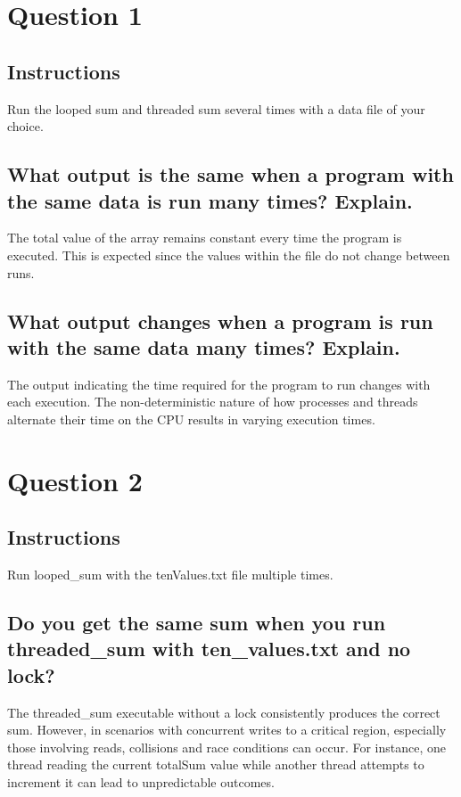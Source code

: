 \documentclass{assignment-x}
\begin{document}
\maketitle
\pagebreak

\section{Question 1}
\subsection{Instructions}
Run the looped sum and threaded sum several times with a data file of your choice.

\subsection{What output is the same when a program with the same data is run many times? Explain.}
The total value of the array remains constant every time the program is executed. This is expected since the values within the file do not change between runs.

\subsection{What output changes when a program is run with the same data many times? Explain.}
The output indicating the time required for the program to run changes with each execution. The non-deterministic nature of how processes and threads alternate their time on the CPU results in varying execution times.

\section{Question 2}
\subsection{Instructions}
Run looped\_sum with the tenValues.txt file multiple times.

\subsection{Do you get the same sum when you run threaded\_sum with ten\_values.txt and no lock?}
The threaded\_sum executable without a lock consistently produces the correct sum. However, in scenarios with concurrent writes to a critical region, especially those involving reads, collisions and race conditions can occur. For instance, one thread reading the current totalSum value while another thread attempts to increment it can lead to unpredictable outcomes.
\end{document}
